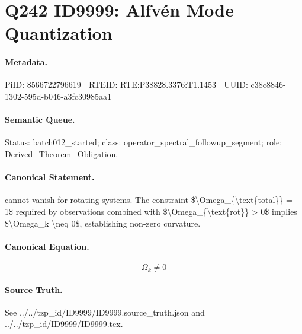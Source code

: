 \section*{Q242 ID9999: Alfvén Mode Quantization}
\paragraph{Metadata.}
PiID: 8566722796619 | RTEID: RTE:P38828.3376:T1.1453 | UUID: c38c8846-1302-595d-b046-a3fc30985aa1

\paragraph{Semantic Queue.}
Status: batch012\_started; class: operator\_spectral\_followup\_segment; role: Derived\_Theorem\_Obligation.

\paragraph{Canonical Statement.}
cannot vanish for rotating systems. The constraint \$\textbackslash{}Omega\_\{\textbackslash{}text\{total\}\} = 1\$ required by observations combined with \$\textbackslash{}Omega\_\{\textbackslash{}text\{rot\}\} > 0\$ implies \$\textbackslash{}Omega\_k \textbackslash{}neq 0\$, establishing non-zero curvature.

\paragraph{Canonical Equation.}
\[
\Omega_k \neq 0
\]

\paragraph{Source Truth.}
See ../../tzp\_id/ID9999/ID9999.source\_truth.json and ../../tzp\_id/ID9999/ID9999.tex.
